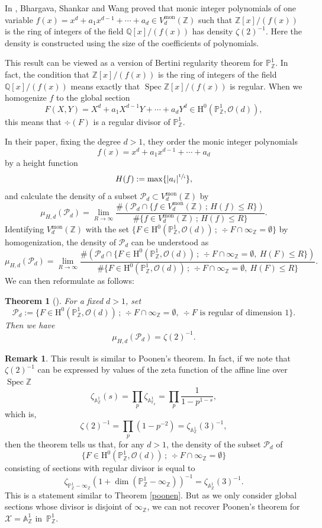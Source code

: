 \documentclass[JEP,XML,SOM,Unicode,published]{cedram}
\newcommand{\sep}{\,;\,}
\theoremstyle{plain}
\newtheorem{thm}{Theorem}[section]
\theoremstyle{definition}
\newtheorem*{rmq}{Remark}
\newcommand{\ho}{\mathrm{H}}
\newcommand{\X}{\mathcal{X}}
\newcommand{\A}{\mathbb{A}}
\newcommand{\Q}{\mathbb{Q}}
\newcommand{\Z}{\mathbb{Z}}
\newcommand{\pr}{\mathbb{P}}
\newcommand{\F}{\mathbb{F}}
\DeclareMathOperator{\Spec}{Spec}
\begin{document}
In \cite{BSW16}, Bhargava, Shankar and Wang proved that monic integer polynomials of one variable $f(x)=x^d+a_1x^{d-1}+\cdots+a_d\in V^{\mathrm{mon}}_d(\Z)$ such that $\Z[x]/(f(x))$ is the ring of integers of the field $\Q[x]/(f(x))$ has density $\zeta(2)^{-1}$. Here the density is constructed using the size of the coefficients of polynomials.

This result can be viewed as a version of Bertini regularity theorem for $\pr^1_{\Z}$. In fact, the condition that $\Z[x]/(f(x))$ is the ring of integers of the field $\Q[x]/(f(x))$ means exactly that
$\Spec \Z[x]/(f(x))$ is regular. When we homogenize $f$ to the global section
\[
F(X,Y)=X^d+a_1X^{d-1}Y+\cdots+ a_dY^d\in \ho^0(\pr^1_{\Z}, \mathcal{O}(d)),
\]
this means that $\div (F)$ is a regular divisor of $\pr^1_{\Z}$.

In their paper, fixing the degree $d>1$, they order the monic integer polynomials
\[
f(x)=x^d+a_1x^{d-1}+\cdots+a_d
\]
by a height function
\[
H(f):=\max\{ |a_i|^{\sfrac{1}{i}} \},
\]
and calculate the density of a subset $\mathcal{P}_d\subset V^{\mathrm{mon}}_d(\Z)$ by
\[
\mu_{H,d}(\mathcal{P}_d)=\lim_{R\to \infty} \frac{ \#\left(\mathcal{P}_d\cap \{ f\in V^{\mathrm{mon}}_d(\Z)\sep H(f)\leq R \} \right)}{\#\{ f\in V^{\mathrm{mon}}_d(\Z)\sep H(f)\leq R \}}.
\]
Identifying $V^{\mathrm{mon}}_d(\Z)$ with the set $\{ F\in \ho^0(\pr^1_{\Z}, \mathcal{O}(d))\sep \div F\cap \infty_{\Z}=\emptyset \}$ by homogenization, the density of
$\mathcal{P}_d$ can be understood as
\[
\mu_{H,d}(\mathcal{P}_d)=\lim_{R\to \infty} \frac{ \#\left(\mathcal{P}_d\cap \{ F\in \ho^0(\pr^1_{\Z}, \mathcal{O}(d))\sep \div F\cap \infty_{\Z}=\emptyset,\ H(F)\leq R \} \right)}{\#\{ F\in \ho^0(\pr^1_{\Z}, \mathcal{O}(d))\sep \div F\cap \infty_{\Z}=\emptyset,\ H(F)\leq R \}}.
\]
We can then reformulate \cite[Th.\,1.2]{BSW16} as follows:
\begin{thm}[{\cite[Th.\,1.2]{BSW16}}]
For a fixed $d>1$, set
\[
\mathcal{P}_d:=\{ F\in \ho^0(\pr^1_{\Z}, \mathcal{O}(d))\sep \div F\cap \infty_{\Z}=\emptyset,\ \div F \text{ is regular of dimension }1 \}.
\]
Then we have
\[
\mu_{H,d}(\mathcal{P}_d)=\zeta(2)^{-1}.
\]
\end{thm}
\begin{rmq}
This result is similar to Poonen's theorem. In fact, if we note that $\zeta(2)^{-1}$ can be expressed by values of the zeta function of the affine line over $\Spec \Z$
\[
\zeta_{\A^1_{\Z}}(s)=\prod_{p}\zeta_{\A^1_{\F_p}}=\prod_{p}\frac{1}{1-p^{1-s}},
\]
which is,
\[
\zeta(2)^{-1}=\prod_p (1-p^{-2})=\zeta_{\A^1_{\Z}}(3)^{-1},
\]
then the theorem tells us that, for any $d>1$, the density of the subset $\mathcal{P}_d$ of
\[
\{ F\in \ho^0(\pr^1_{\Z}, \mathcal{O}(d))\sep \div F\cap \infty_{\Z}=\emptyset \}
\]
consisting of sections with regular divisor is equal to
\[
\zeta_{\pr^1_{\Z}-\infty_{\Z}}\left(1+\dim(\pr^1_{\Z}-\infty_{\Z}) \right)^{-1}=\zeta_{\A^1_{\Z}}(3)^{-1}.
\]
This is a statement similar to Theorem \ref{poonen}. But as we only consider global sections whose divisor is disjoint of $\infty_{\Z}$, we can not recover Poonen's theorem for $\X=\A^1_{\Z}$ in~$\pr^1_{\Z}$.
\end{rmq}
\end{document}

